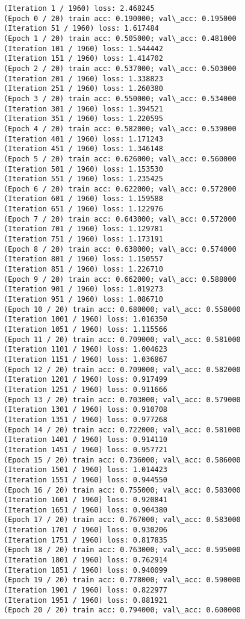 \documentclass[11pt]{article}
\begin{document}
    \begin{Verbatim}[commandchars=\\\{\}]
(Iteration 1 / 1960) loss: 2.468245
(Epoch 0 / 20) train acc: 0.190000; val\_acc: 0.195000
(Iteration 51 / 1960) loss: 1.617484
(Epoch 1 / 20) train acc: 0.505000; val\_acc: 0.481000
(Iteration 101 / 1960) loss: 1.544442
(Iteration 151 / 1960) loss: 1.414702
(Epoch 2 / 20) train acc: 0.537000; val\_acc: 0.503000
(Iteration 201 / 1960) loss: 1.338823
(Iteration 251 / 1960) loss: 1.260380
(Epoch 3 / 20) train acc: 0.550000; val\_acc: 0.534000
(Iteration 301 / 1960) loss: 1.394521
(Iteration 351 / 1960) loss: 1.220595
(Epoch 4 / 20) train acc: 0.582000; val\_acc: 0.539000
(Iteration 401 / 1960) loss: 1.171243
(Iteration 451 / 1960) loss: 1.346148
(Epoch 5 / 20) train acc: 0.626000; val\_acc: 0.560000
(Iteration 501 / 1960) loss: 1.153530
(Iteration 551 / 1960) loss: 1.235425
(Epoch 6 / 20) train acc: 0.622000; val\_acc: 0.572000
(Iteration 601 / 1960) loss: 1.159588
(Iteration 651 / 1960) loss: 1.122976
(Epoch 7 / 20) train acc: 0.643000; val\_acc: 0.572000
(Iteration 701 / 1960) loss: 1.129781
(Iteration 751 / 1960) loss: 1.173191
(Epoch 8 / 20) train acc: 0.638000; val\_acc: 0.574000
(Iteration 801 / 1960) loss: 1.150557
(Iteration 851 / 1960) loss: 1.226710
(Epoch 9 / 20) train acc: 0.662000; val\_acc: 0.588000
(Iteration 901 / 1960) loss: 1.019273
(Iteration 951 / 1960) loss: 1.086710
(Epoch 10 / 20) train acc: 0.680000; val\_acc: 0.558000
(Iteration 1001 / 1960) loss: 1.016350
(Iteration 1051 / 1960) loss: 1.115566
(Epoch 11 / 20) train acc: 0.709000; val\_acc: 0.581000
(Iteration 1101 / 1960) loss: 1.004623
(Iteration 1151 / 1960) loss: 1.036867
(Epoch 12 / 20) train acc: 0.709000; val\_acc: 0.582000
(Iteration 1201 / 1960) loss: 0.917499
(Iteration 1251 / 1960) loss: 0.911666
(Epoch 13 / 20) train acc: 0.703000; val\_acc: 0.579000
(Iteration 1301 / 1960) loss: 0.910708
(Iteration 1351 / 1960) loss: 0.977268
(Epoch 14 / 20) train acc: 0.722000; val\_acc: 0.581000
(Iteration 1401 / 1960) loss: 0.914110
(Iteration 1451 / 1960) loss: 0.957721
(Epoch 15 / 20) train acc: 0.736000; val\_acc: 0.586000
(Iteration 1501 / 1960) loss: 1.014423
(Iteration 1551 / 1960) loss: 0.944550
(Epoch 16 / 20) train acc: 0.755000; val\_acc: 0.583000
(Iteration 1601 / 1960) loss: 0.920841
(Iteration 1651 / 1960) loss: 0.904380
(Epoch 17 / 20) train acc: 0.767000; val\_acc: 0.583000
(Iteration 1701 / 1960) loss: 0.930206
(Iteration 1751 / 1960) loss: 0.817835
(Epoch 18 / 20) train acc: 0.763000; val\_acc: 0.595000
(Iteration 1801 / 1960) loss: 0.762914
(Iteration 1851 / 1960) loss: 0.940099
(Epoch 19 / 20) train acc: 0.778000; val\_acc: 0.590000
(Iteration 1901 / 1960) loss: 0.822977
(Iteration 1951 / 1960) loss: 0.881921
(Epoch 20 / 20) train acc: 0.794000; val\_acc: 0.600000

    \end{Verbatim}
\end{document}
